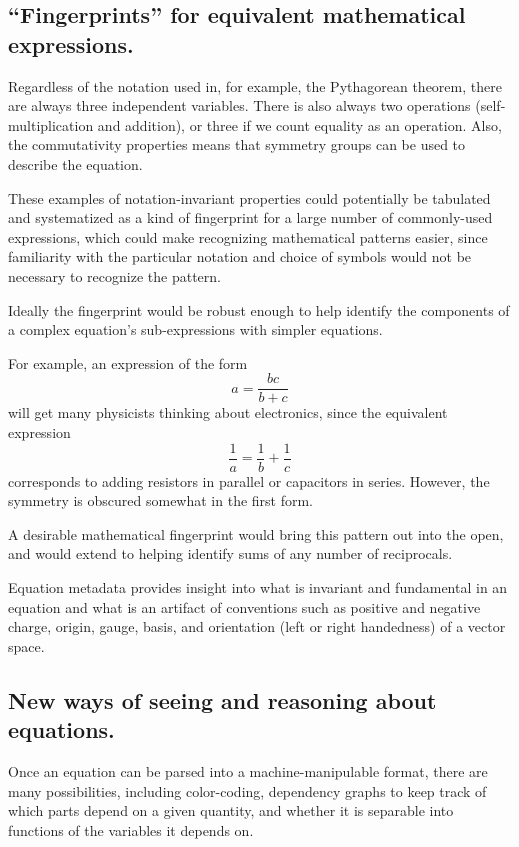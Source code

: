 \documentclass[12pt,letterpaper]{article}
\begin{document}
\subsection{``Fingerprints'' for equivalent mathematical expressions.}

Regardless of the notation used in,
for example,
the Pythagorean theorem,
there are always three independent variables.
There is also always two operations (self-multiplication and addition),
or three if we count equality as an operation.
Also, the commutativity properties means that symmetry groups can be used to describe the equation.

These examples of notation-invariant properties could potentially be tabulated and systematized
as a kind of fingerprint for a large number of commonly-used expressions,
which could make recognizing mathematical patterns easier,
since familiarity with the particular notation and choice of symbols would not be necessary to recognize the pattern.

Ideally the fingerprint would be robust enough to help identify the components of a complex equation's sub-expressions with simpler equations.

For example, an expression of the form
\[ a = \frac{b c}{b +c} \]
will get many physicists thinking about electronics,
since the equivalent expression
\[ \frac{1}{a} = \frac{1}{b} + \frac{1}{c} \]
corresponds to adding resistors in parallel or capacitors in series.
However, the symmetry is obscured somewhat in the first form.

A desirable mathematical fingerprint would bring this pattern out into the open,
and would extend to helping identify sums of any number of reciprocals.

Equation metadata provides insight into what is invariant and fundamental in an equation
and what is an artifact of conventions such as positive and negative charge,
origin, gauge, basis, and orientation (left or right handedness) of a vector space.

\subsection{New ways of seeing and reasoning about equations.}

Once an equation can be parsed into a machine-manipulable format,
there are many possibilities,
including color-coding,
dependency graphs to keep track of which parts depend on a given quantity,
and whether it is separable into functions of the variables it depends on.
\end{document}
